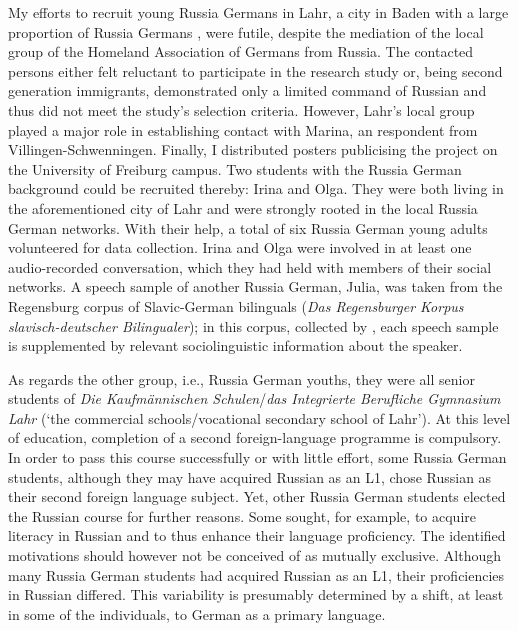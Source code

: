 My efforts to recruit young Russia Germans in Lahr, a city in Baden with a large proportion of Russia Germans \citep[cf.][]{roll03}, were futile, despite the mediation of the local group of the Homeland Association of Germans from Russia. The contacted persons either felt reluctant to participate in the research study or, being second generation immigrants, demonstrated only a limited command of Russian and thus did not meet the study's selection criteria. However, Lahr's local group played a major role in establishing contact with Marina, an respondent from Villingen-Schwenningen. Finally, I distributed posters publicising the project on the University of Freiburg campus. Two students with the Russia German background could be recruited thereby: Irina and Olga. They were both living in the aforementioned city of Lahr and were strongly rooted in the local Russia German networks. With their help, a total of six Russia German young adults volunteered for data collection. Irina and Olga were involved in at least one audio-recorded conversation, which they had held with members of their social networks. A speech sample of another Russia German, Julia, was taken from the Regensburg corpus of Slavic-German bilinguals (\textit{Das Regensburger Korpus slavisch-deutscher Bilingualer}); in this corpus, collected by \citet{rebislav}, each speech sample is supplemented by relevant sociolinguistic information about the speaker.

As regards the other group, i.e., Russia German youths, they were all senior students of \textit{Die Kaufmännischen Schulen}\slash \textit{das Integrierte Berufliche Gymnasium Lahr} (`the commercial schools\slash vocational secondary school of Lahr'). At this level of education, completion of a second foreign-language programme is compulsory. In order to pass this course successfully or with little effort, some Russia German students, although they may have acquired Russian as an L1, chose Russian as their second foreign language subject. Yet, other Russia German students elected the Russian course for further reasons. Some sought, for example, to acquire literacy in Russian and to thus enhance their language proficiency. The identified motivations should however not be conceived of as mutually exclusive. Although many Russia German students had acquired Russian as an L1, their proficiencies in Russian differed. This variability is presumably determined by a shift, at least in some of the individuals, to German as a primary language.

